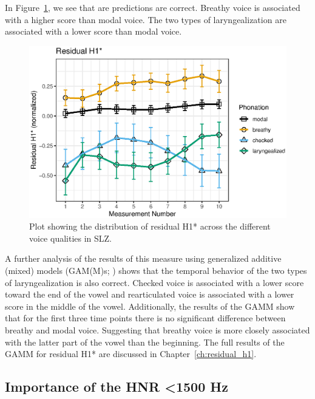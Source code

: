 In Figure~\ref{fig:residualH1}, we see that are predictions are correct. Breathy voice is associated with a higher score than modal voice. The two types of laryngealization are associated with a lower score than modal voice.

\begin{figure}[h!]
    \centering
    \includegraphics[width = 0.9\linewidth]{images/slz_residual_h1c.eps}
    \caption{Plot showing the distribution of residual H1* across the different voice qualities in SLZ.}
    \label{fig:residualH1}
\end{figure}

A further analysis of the results of this measure using generalized additive (mixed) models (GAM(M)s; \cite{hastieGeneralizedAdditiveModels1986,woodGeneralizedAdditiveModels2017,soskuthyGeneralisedAdditiveMixed2017,wielingAnalyzingDynamicPhonetic2018}) shows that the temporal behavior of the two types of laryngealization is also correct. Checked voice is associated with a lower score toward the end of the vowel and rearticulated voice is associated with a lower score in the middle of the vowel. Additionally, the results of the GAMM show that for the first three time points there is no significant difference between breathy and modal voice. Suggesting that breathy voice is more closely associated with the latter part of the vowel than the beginning. The full results of the GAMM for residual H1* are discussed in Chapter~\ref{ch:residual_h1}.

\subsection{Importance of the HNR \textless 1500 Hz} \label{sec:bagging_hnr}

